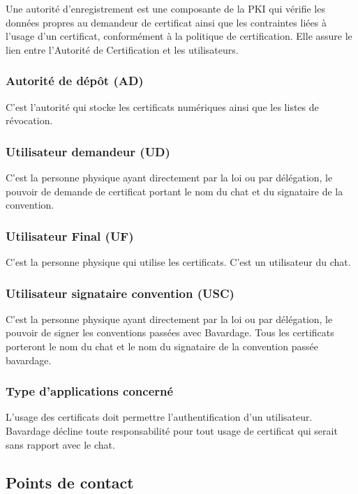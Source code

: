 \documentclass[a4paper,11pt,french]{book}
\begin{document}
Une autorité d’enregistrement est une composante de la PKI qui vérifie les données propres au demandeur de certificat ainsi que les contraintes liées à l’usage d’un certificat, conformément à la politique de certification. Elle assure le lien entre l'Autorité de Certification et les utilisateurs. 

\subsubsection{Autorité de dépôt (AD)}
C'est l'autorité qui stocke les certificats numériques ainsi que les listes de révocation.

\subsubsection{ Utilisateur demandeur (UD)}

C'est la personne physique ayant directement par la loi ou par délégation, le pouvoir de demande de certificat portant le nom du chat et du signataire de la convention.

\subsubsection{ Utilisateur Final (UF)}

C'est la personne physique qui utilise les certificats. C'est un utilisateur du chat.

\subsubsection{Utilisateur signataire convention (USC)}

C'est la personne physique ayant directement par la loi ou par délégation, le pouvoir de signer les conventions passées avec Bavardage. Tous les certificats porteront le nom du chat et le nom du signataire de la convention passée bavardage. 
		
\subsubsection{Type d'applications concerné}

L'usage des certificats doit permettre l'authentification d'un utilisateur. Bavardage décline toute responsabilité pour tout usage de certificat qui serait sans rapport avec le chat.

\subsection{Points de contact}
\end{document}
